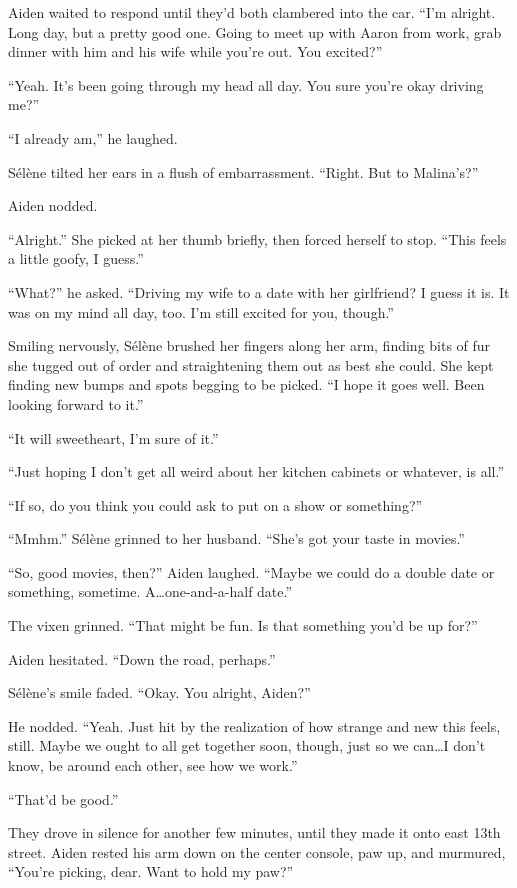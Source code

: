Aiden waited to respond until they'd both clambered into the car. ``I'm alright. Long day, but a pretty good one. Going to meet up with Aaron from work, grab dinner with him and his wife while you're out. You excited?''

``Yeah. It's been going through my head all day. You sure you're okay driving me?''

``I already am,'' he laughed.

Sélène tilted her ears in a flush of embarrassment. ``Right. But to Malina's?''

Aiden nodded.

``Alright.'' She picked at her thumb briefly, then forced herself to stop. ``This feels a little goofy, I guess.''

``What?'' he asked. ``Driving my wife to a date with her girlfriend? I guess it is. It was on my mind all day, too. I'm still excited for you, though.''

Smiling nervously, Sélène brushed her fingers along her arm, finding bits of fur she tugged out of order and straightening them out as best she could. She kept finding new bumps and spots begging to be picked. ``I hope it goes well. Been looking forward to it.''

``It will sweetheart, I'm sure of it.''

``Just hoping I don't get all weird about her kitchen cabinets or whatever, is all.''

``If so, do you think you could ask to put on a show or something?''

``Mmhm.'' Sélène grinned to her husband. ``She's got your taste in movies.''

``So, good movies, then?'' Aiden laughed. ``Maybe we could do a double date or something, sometime. A\ldots{}one-and-a-half date.''

The vixen grinned. ``That might be fun. Is that something you'd be up for?''

Aiden hesitated. ``Down the road, perhaps.''

Sélène's smile faded. ``Okay. You alright, Aiden?''

He nodded. ``Yeah. Just hit by the realization of how strange and new this feels, still. Maybe we ought to all get together soon, though, just so we can\ldots{}I don't know, be around each other, see how we work.''

``That'd be good.''

They drove in silence for another few minutes, until they made it onto east 13th street. Aiden rested his arm down on the center console, paw up, and murmured, ``You're picking, dear. Want to hold my paw?''

